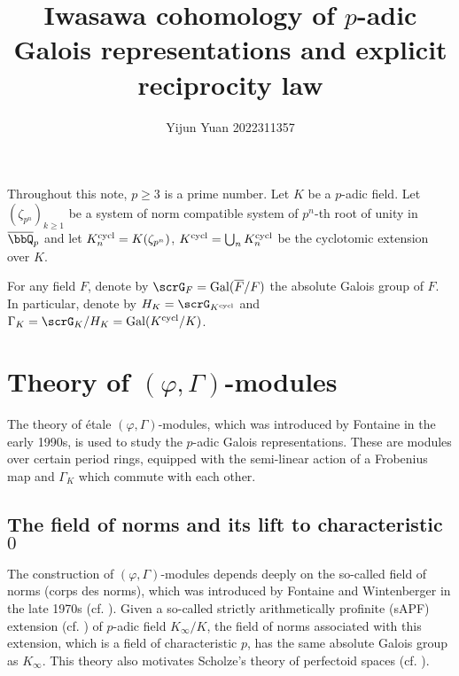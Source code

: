 \documentclass[a4paper,oneside]{amsart}
\title{Iwasawa cohomology of $p$-adic Galois representations and explicit reciprocity law}
\author{Yijun Yuan\textsuperscript{\orcidlink{0000-0001-6571-6980}} 2022311357}
\numberwithin{equation}{section}
\numberwithin{figure}{section}
\begin{document}
\maketitle
\tableofcontents
Throughout this note, $p\geq 3$ is a prime number. Let $K$ be a $p$-adic field. Let $(\zeta_{p^n})_{k\geq 1}$ be a system of norm compatible system of $p^n$-th root of unity in $\overline{\bbQ}_p$ and let $K_n^{\operatorname{cycl}}=K(\zeta_{p^n})$, $K^{\operatorname{cycl}}=\bigcup_n K_n^{\operatorname{cycl}}$ be the cyclotomic extension over $K$.

For any field $F$, denote by $\scrG_F=\opn{Gal}(\overline{F}/F)$ the absolute Galois group of $F$. In particular, denote by $H_K=\scrG_{K^{\opn{cycl}}}$ and $\Gamma_K=\scrG_K/H_K=\opn{Gal}(K^{\opn{cycl}}/K)$.
\section{Theory of $(\varphi,\Gamma)$-modules}
The theory of \'etale $(\varphi,\Gamma)$-modules, which was introduced by Fontaine in the early 1990s, is used to study the $p$-adic Galois representations. These are modules over certain period rings, equipped with the semi-linear action of a Frobenius map and $\Gamma_K$ which commute with each other.

\subsection{The field of norms and its lift to characteristic $0$}
The construction of $(\varphi,\Gamma)$-modules depends deeply on the so-called field of norms (corps des norms), which was introduced by Fontaine and Wintenberger in the late 1970s (cf. \cite{fontaine_extensions_1979,fontaine_corps_1979,wintenberger_corps_1983}). Given a so-called strictly arithmetically profinite (sAPF) extension (cf. \cite[D\'efinitions 1.2.1]{wintenberger_corps_1983}) of $p$-adic field $K_\infty/K$, the field of norms associated with this extension, which is a field of characteristic $p$, has the same absolute Galois group as $K_\infty$. This theory also motivates Scholze's theory of perfectoid spaces (cf. \cite[Theorem 1.1]{scholze_perfectoid_2012}).
\end{document}
